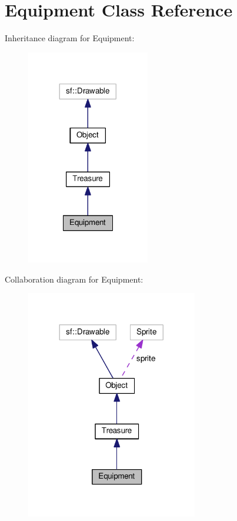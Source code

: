 \hypertarget{classEquipment}{\section{Equipment Class Reference}
\label{classEquipment}
}


Inheritance diagram for Equipment\+:
\nopagebreak
\begin{figure}[H]
\begin{center}
\leavevmode
\includegraphics[width=152pt]{classEquipment__inherit__graph}
\end{center}
\end{figure}


Collaboration diagram for Equipment\+:
\nopagebreak
\begin{figure}[H]
\begin{center}
\leavevmode
\includegraphics[width=212pt]{classEquipment__coll__graph}
\end{center}
\end{figure}

